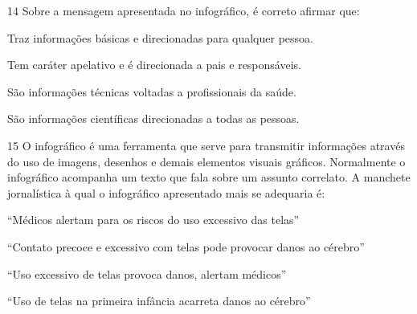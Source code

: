 \num{14} Sobre a mensagem apresentada no infográfico, é correto afirmar
que:

\begin{escolha}
\item Traz informações básicas e direcionadas para qualquer pessoa.
\item Tem caráter apelativo e é direcionada a pais e responsáveis.
\item São informações técnicas voltadas a profissionais da saúde.
\item São informações científicas direcionadas a todas as pessoas.
\end{escolha}






\num{15} O infográfico é uma ferramenta que serve para transmitir
informações através do uso de imagens, desenhos e demais elementos
visuais gráficos. Normalmente o infográfico acompanha um texto que fala
sobre um assunto correlato. A manchete jornalística à qual o infográfico
apresentado mais se adequaria é:

\begin{escolha}
\item ``Médicos alertam para os riscos do uso excessivo das telas''
\item ``Contato precoce e excessivo com telas pode provocar danos ao
cérebro﻿''
\item ``Uso excessivo de telas provoca danos, alertam médicos''
\item ``Uso de telas na primeira infância acarreta danos ao cérebro''
\end{escolha}

